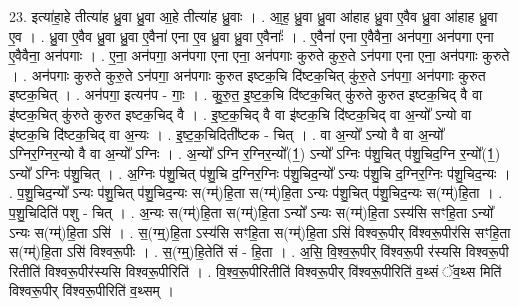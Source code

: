 \documentclass[17pt]{extarticle}
\begin{document}
23. इत्या॑हा॒हे तीत्या॑ह ध्रु॒वा ध्रु॒वा आ॒हे तीत्या॑ह ध्रु॒वाः । . आ॒ह॒ ध्रु॒वा ध्रु॒वा आ॑हाह ध्रु॒वा ए॒वैव ध्रु॒वा आ॑हाह ध्रु॒वा ए॒व । . ध्रु॒वा ए॒वैव ध्रु॒वा ध्रु॒वा ए॒वैना॑ एना ए॒व ध्रु॒वा ध्रु॒वा ए॒वैनाः᳚ । . ए॒वैना॑ एना ए॒वैवैना॒ अन॑पगा॒ अन॑पगा एना ए॒वैवैना॒ अन॑पगाः । . ए॒ना॒ अन॑पगा॒ अन॑पगा एना एना॒ अन॑पगाः कुरुते कुरु॒ते ऽन॑पगा एना एना॒ अन॑पगाः कुरुते । . अन॑पगाः कुरुते कुरु॒ते ऽन॑पगा॒ अन॑पगाः कुरुत इष्टक॒चि दि॑ष्टक॒चित् कु॑रु॒ते ऽन॑पगा॒ अन॑पगाः कुरुत इष्टक॒चित् । . अन॑पगा॒ इत्यन॑प - गाः॒ । . कु॒रु॒त॒ इ॒ष्ट॒क॒चि दि॑ष्टक॒चित् कु॑रुते कुरुत इष्टक॒चिद् वै वा इ॑ष्टक॒चित् कु॑रुते कुरुत इष्टक॒चिद् वै । . इ॒ष्ट॒क॒चिद् वै वा इ॑ष्टक॒चि दि॑ष्टक॒चिद् वा अ॒न्यो᳚ ऽन्यो वा इ॑ष्टक॒चि दि॑ष्टक॒चिद् वा अ॒न्यः । . इ॒ष्ट॒क॒चिदिती᳚ष्टक - चित् । . वा अ॒न्यो᳚ ऽन्यो वै वा अ॒न्यो᳚ ऽग्निर॒ग्निर॒न्यो वै वा अ॒न्यो᳚ ऽग्निः । . अ॒न्यो᳚ ऽग्नि र॒ग्निर॒न्यो᳚(1॒) ऽन्यो᳚ ऽग्निः प॑शु॒चित् प॑शु॒चिद॒ग्नि र॒न्यो᳚(1॒) ऽन्यो᳚ ऽग्निः प॑शु॒चित् । . अ॒ग्निः प॑शु॒चित् प॑शु॒चि द॒ग्निर॒ग्निः प॑शु॒चिद॒न्यो᳚ ऽन्यः प॑शु॒चि द॒ग्निर॒ग्निः प॑शु॒चिद॒न्यः । . प॒शु॒चिद॒न्यो᳚ ऽन्यः प॑शु॒चित् प॑शु॒चिद॒न्यः स(ग्म्॑)हि॒ता स(ग्म्॑)हि॒ता ऽन्यः प॑शु॒चित् प॑शु॒चिद॒न्यः स(ग्म्॑)हि॒ता । . प॒शु॒चिदिति॑ पशु - चित् । . अ॒न्यः स(ग्म्॑)हि॒ता स(ग्म्॑)हि॒ता ऽन्यो᳚ ऽन्यः स(ग्म्॑)हि॒ता ऽस्य॑सि सꣳहि॒ता ऽन्यो᳚ ऽन्यः स(ग्म्॑)हि॒ता ऽसि॑ । . स॒(ग्म्॒)हि॒ता ऽस्य॑सि सꣳहि॒ता स(ग्म्॑)हि॒ता ऽसि॑ विश्वरू॒पीर् वि॑श्वरू॒पीर॑सि सꣳहि॒ता स(ग्म्॑)हि॒ता ऽसि॑ विश्वरू॒पीः । . स॒(ग्म्॒)हि॒तेति॑ सं - हि॒ता । . अ॒सि॒ वि॒श्व॒रू॒पीर् वि॑श्वरू॒पी र॑स्यसि विश्वरू॒पी रितीति॑ विश्वरू॒पीर॑स्यसि विश्वरू॒पीरिति॑ । . वि॒श्व॒रू॒पीरितीति॑ विश्वरू॒पीर् वि॑श्वरू॒पीरिति॑ व॒थ्सं ॅव॒थ्स मिति॑ विश्वरू॒पीर् वि॑श्वरू॒पीरिति॑ व॒थ्सम् । \newline
\end{document}
